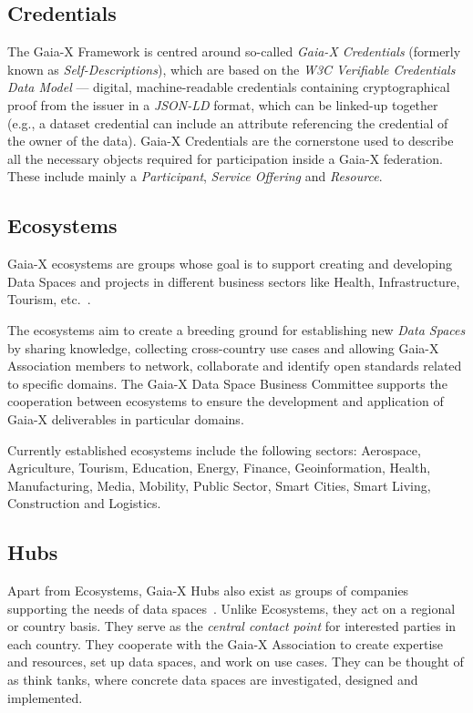 \subsection{Credentials}\label{subsec:self-descriptions}

The Gaia-X Framework is centred around so-called \textit{Gaia-X Credentials} (formerly known as \textit{Self-Descriptions}), which are based on the \textit{W3C Verifiable Credentials Data Model} --- digital, machine-readable credentials containing cryptographical proof from the issuer in a \textit{JSON-LD} format, which can be linked-up together (e.g., a dataset credential can include an attribute referencing the credential of the owner of the data).
Gaia-X Credentials are the cornerstone used to describe all the necessary objects required for participation inside a Gaia-X federation.
These include mainly a \textit{Participant}, \textit{Service Offering} and \textit{Resource}.

\subsection{Ecosystems}\label{subsec:ecosystems}

Gaia-X ecosystems are groups whose goal is to support creating and developing Data Spaces and projects in different business sectors like Health, Infrastructure, Tourism, etc.~\cite{gaiax}.

The ecosystems aim to create a breeding ground for establishing new \textit{Data Spaces} by sharing knowledge, collecting cross-country use cases and allowing Gaia-X Association members to network, collaborate and identify open standards related to specific domains.
The Gaia-X Data Space Business Committee supports the cooperation between ecosystems to ensure the development and application of Gaia-X deliverables in particular domains.

Currently established ecosystems include the following sectors: Aerospace, Agriculture, Tourism, Education, Energy, Finance, Geoinformation, Health, Manufacturing, Media, Mobility, Public Sector, Smart Cities, Smart Living, Construction and Logistics.

\subsection{Hubs}\label{subsec:hubs}

Apart from Ecosystems, Gaia-X Hubs also exist as groups of companies supporting the needs of data spaces~\cite{gaiax}.
Unlike Ecosystems, they act on a regional or country basis.
They serve as the \textit{central contact point} for interested parties in each country.
They cooperate with the Gaia-X Association to create expertise and resources, set up data spaces, and work on use cases.
They can be thought of as think tanks, where concrete data spaces are investigated, designed and implemented.

